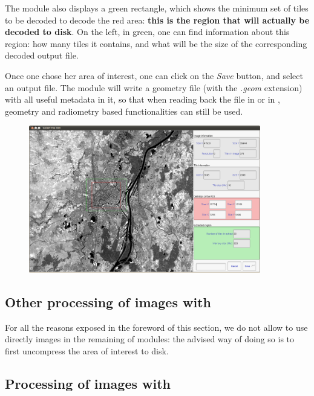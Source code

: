 The module also displays a green rectangle, which shows the minimum
set of tiles to be decoded to decode the red area: \textbf{this is the
region that will actually be decoded to disk}. On the left, in green,
one can find information about this region: how many tiles it
contains, and what will be the size of the corresponding decoded
output file.

Once one chose her area of interest, one can click on
the \textit{Save} button, and select an output file. The module will
write a geometry file (with the \textit{.geom} extension) with all
useful metadata in it, so that when reading back the file in \mont or
in \app, geometry and radiometry based functionalities can still be
used.

\begin{figure}[!t]
  \center
  \includegraphics[width=0.9\textwidth]{../Art/MonteverdiImages/pleiades_uncom.png}
  \label{fig:pleiades_uncom}
\end{figure}


\subsection{Other processing of \phr images with \mont}

For all the reasons exposed in the foreword of this section, we do not
allow to use directly \phr images in the remaining of \mont modules:
the advised way of doing so is to first uncompress the area of
interest to disk.

\subsection{Processing of \phr images with \app}

